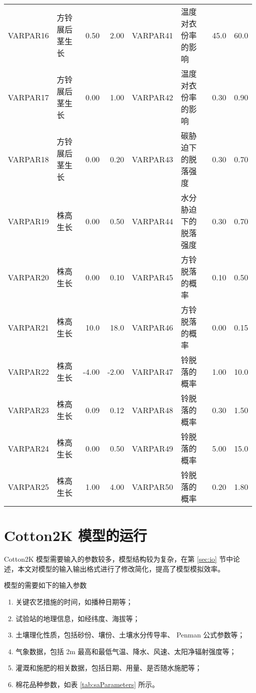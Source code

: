 \begin{table}
\begin{tabular}{llrr|llrr}
        VARPAR16 & 方铃展后茎生长       & 0.50  & 2.00  & VARPAR41 & 温度对衣份率的影响         & 45.0   & 60.0   \\
        VARPAR17 & 方铃展后茎生长       & 0.00  & 1.00  & VARPAR42 & 温度对衣份率的影响         & 0.30   & 0.90   \\
        VARPAR18 & 方铃展后茎生长       & 0.00  & 0.20  & VARPAR43 & 碳胁迫下的脱落强度         & 0.30   & 0.70   \\
        VARPAR19 & 株高生长             & 0.00  & 0.50  & VARPAR44 & 水分胁迫下的脱落强度       & 0.30   & 0.70   \\
        VARPAR20 & 株高生长             & 0.00  & 0.10  & VARPAR45 & 方铃脱落的概率             & 0.10   & 0.50   \\
        VARPAR21 & 株高生长             & 10.0  & 18.0  & VARPAR46 & 方铃脱落的概率             & 0.00   & 0.15   \\
        VARPAR22 & 株高生长             & -4.00 & -2.00 & VARPAR47 & 铃脱落的概率               & 1.00   & 10.0   \\
        VARPAR23 & 株高生长             & 0.09  & 0.12  & VARPAR48 & 铃脱落的概率               & 0.30   & 1.50   \\
        VARPAR24 & 株高生长             & 0.00  & 0.50  & VARPAR49 & 铃脱落的概率               & 5.00   & 15.0   \\
        VARPAR25 & 株高生长             & 1.00  & 4.00  & VARPAR50 & 铃脱落的概率               & 0.20   & 1.80   \\
        \bottomrule
    \end{tabular}
\end{table}

\section{Cotton2K 模型的运行}
Cotton2K 模型需要输入的参数较多，模型结构较为复杂，在第 \ref{sec:io} 节中论述，本文对模型的输入输出格式进行了修改简化，提高了模型模拟效率。

模型的需要如下的输入参数
\begin{enumerate}
    \item 关键农艺措施的时间，如播种日期等；
    \item 试验站的地理信息，如经纬度、海拔等；
    \item 土壤理化性质，包括砂份、壤份、土壤水分传导率、 Penman 公式参数等；
    \item 气象数据，包括 2m 最高和最低气温、降水、风速、太阳净辐射强度等；
    \item 灌溉和施肥的相关数据，包括日期、用量、是否随水施肥等；
    \item 棉花品种参数，如表 \ref{tab:saParameters} 所示。
\end{enumerate}

